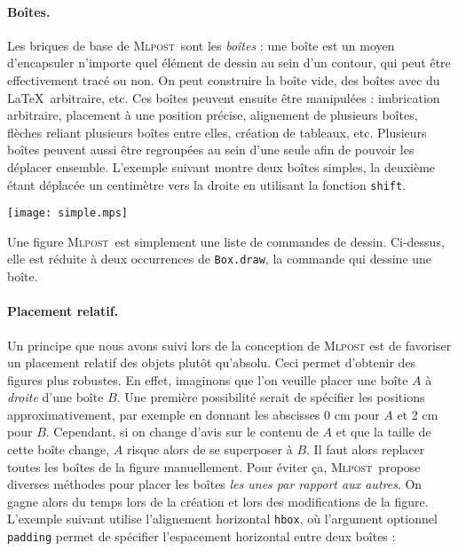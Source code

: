 \documentclass[twoside]{studia-Hermann}
\newcommand{\mlpost}{\textsc{Mlpost}}
\begin{document}
\paragraph{Boîtes.}
Les briques de base de \mlpost\ sont les \textit{boîtes} : une boîte
est un moyen d'encapsuler n'importe quel élément de dessin au sein
d'un contour, qui peut être effectivement tracé ou non. On peut
construire la boîte vide, des boîtes avec du \LaTeX\ arbitraire, etc.
Ces boîtes peuvent ensuite être manipulées : imbrication arbitraire,
placement à une position précise, alignement de plusieurs boîtes,
flèches reliant plusieurs boîtes entre elles, création de tableaux,
etc. Plusieurs boîtes peuvent aussi être regroupées au sein d'une
seule afin de pouvoir les déplacer ensemble.  L'exemple suivant montre
deux boîtes simples, la deuxième étant déplacée un centimètre vers la
droite en utilisant la fonction \verb|shift|.

\medskip
\begin{minipage}{0.2\linewidth}
  \texttt{[image: simple.mps]}
\end{minipage}
\begin{minipage}{0.8\linewidth}
\small\begin{ocaml}
\end{ocaml}
\end{minipage}

\medskip\noindent
Une figure \mlpost\ est simplement une liste de commandes de
dessin. Ci-dessus, elle est réduite à deux occurrences de
\texttt{Box.draw}, la commande qui dessine une boîte.

\paragraph{Placement relatif.}
Un principe que nous avons suivi lors de la conception de \mlpost{}
est de favoriser un placement relatif des objets plutôt qu'absolu.
Ceci permet d'obtenir des figures plus robustes. En effet, imaginons
que l'on veuille placer une boîte $A$ à \emph{droite} d'une boîte $B$.
Une première possibilité serait de spécifier les positions
approximativement, par exemple en donnant les abscisses 0 cm pour $A$
et 2 cm pour $B$. Cependant, si on change d'avis sur le contenu de
$A$ et que la taille de cette boîte change, $A$ risque alors de se
superposer à $B$. Il faut alors replacer toutes les boîtes de la
figure manuellement. Pour éviter ça, \mlpost\ propose diverses
méthodes pour placer les boîtes \emph{les unes par rapport aux
  autres}. On gagne alors du temps lors de la création et lors des
modifications de la figure.  L'exemple suivant utilise l'alignement
horizontal \verb|hbox|, où l'argument optionnel \texttt{padding}
permet de spécifier l'espacement horizontal entre deux boîtes :
\end{document}
